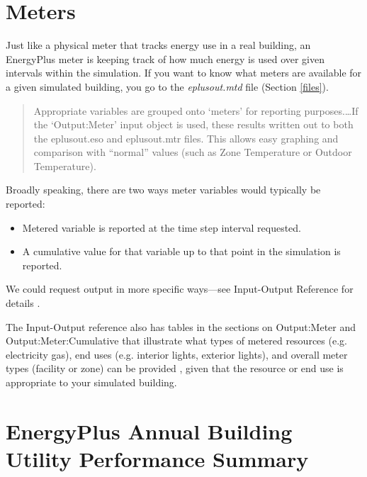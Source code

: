 \documentclass[10pt]{article}
\begin{document}
\section{Meters}

Just like a physical meter that tracks energy use in a real building, an EnergyPlus meter is keeping track of how much energy is used over given intervals within the simulation. If you want to know what meters are available for a given simulated building, you go to the \textit{eplusout.mtd} file (Section \ref{files}).

\begin{quote}
Appropriate variables are grouped onto `meters' for reporting purposes.\ldots If the `Output:Meter' input object
is used, these results written out to both the eplusout.eso and eplusout.mtr files. This allows easy
graphing and comparison with ``normal'' values (such as Zone Temperature or Outdoor Temperature). \cite{EPdocs9inputoutput}
\end{quote}



Broadly speaking, there are two ways meter variables would typically be reported:

\vspace{-2pt}
\begin{itemize}
    \setlength{\itemsep}{0pt}%
    \setlength{\parskip}{0pt}%
    \item Metered variable is reported at the time step interval requested.
    \item A cumulative value for that variable up to that point in the simulation is reported.
\end{itemize}
\vspace{-4pt}

We could request output in more specific ways---see Input-Output Reference for details \cite{EPdocs9inputoutput}. 

The Input-Output reference also has tables in the sections on Output:Meter and 
Output:Meter:Cumulative that illustrate what types of metered resources (e.g. electricity gas), end uses (e.g. interior lights, exterior lights), and overall meter types (facility or zone) can be provided \cite{EPdocs9inputoutput}, given that the resource or end use is appropriate to your simulated building.

\section{EnergyPlus Annual Building Utility Performance Summary}
\end{document}

